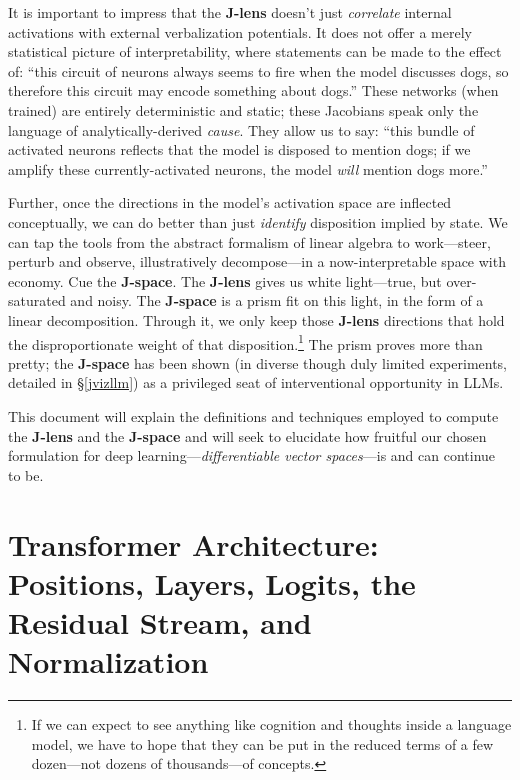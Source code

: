 \documentclass{article}
\begin{document}
It is important to impress that the \textbf{J-lens} doesn't just \textit{correlate} internal activations with external verbalization potentials. It does not offer a merely statistical picture of interpretability, where statements can be made to the effect of: ``this circuit of neurons always seems to fire when the model discusses dogs, so therefore this circuit may encode something about dogs.'' These networks (when trained) are entirely deterministic and static; these Jacobians speak only the language of analytically-derived \textit{cause}. They allow us to say: ``this bundle of activated neurons reflects that the model is disposed to mention dogs; if we amplify these currently-activated neurons, the model \textit{will} mention dogs more.''

Further, once the directions in the model's activation space are inflected conceptually, we can do better than just \textit{identify} disposition implied by state. We can tap the tools from the abstract formalism of linear algebra to work---steer, perturb and observe, illustratively decompose---in a now-interpretable space with economy. Cue the \textbf{J-space}. The \textbf{J-lens} gives us white light---true, but over-saturated and noisy. The \textbf{J-space} is a prism fit on this light, in the form of a linear decomposition. Through it, we only keep those \textbf{J-lens} directions that hold the disproportionate weight of that disposition.\footnote{If we can expect to see anything like cognition and thoughts inside a language model, we have to hope that they can be put in the reduced terms of a few dozen---not dozens of thousands---of concepts.} The prism proves more than pretty; the \textbf{J-space} has been shown (in diverse though duly limited experiments, detailed in \S\ref{jvizllm}) as a privileged seat of interventional opportunity in LLMs. 


This document will explain the definitions and techniques employed to compute the \textbf{J-lens} and the \textbf{J-space} and will seek to elucidate how fruitful our chosen formulation for deep learning---\textit{differentiable vector spaces}---is and can continue to be. 

\section{Transformer Architecture: Positions, Layers, Logits, the Residual Stream, and Normalization}
\end{document}
